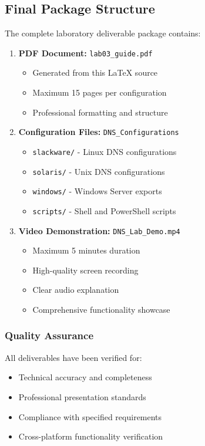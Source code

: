\documentclass[12pt,a4paper]{article}
\begin{document}
\subsection{Final Package Structure}\label{subsec:package-structure}

The complete laboratory deliverable package contains:

\begin{enumerate}
    \item \textbf{PDF Document:} \texttt{lab03\_guide.pdf}
    \begin{itemize}
        \item Generated from this LaTeX source
        \item Maximum 15 pages per configuration
        \item Professional formatting and structure
    \end{itemize}
    
    \item \textbf{Configuration Files:} \texttt{DNS\_Configurations}
    \begin{itemize}
        \item \texttt{slackware/} - Linux DNS configurations
        \item \texttt{solaris/} - Unix DNS configurations  
        \item \texttt{windows/} - Windows Server exports
        \item \texttt{scripts/} - Shell and PowerShell scripts
    \end{itemize}
    
    \item \textbf{Video Demonstration:} \texttt{DNS\_Lab\_Demo.mp4}
    \begin{itemize}
        \item Maximum 5 minutes duration
        \item High-quality screen recording
        \item Clear audio explanation
        \item Comprehensive functionality showcase
    \end{itemize}
\end{enumerate}

\subsubsection{Quality Assurance}
All deliverables have been verified for:
\begin{itemize}
    \item Technical accuracy and completeness
    \item Professional presentation standards
    \item Compliance with specified requirements
    \item Cross-platform functionality verification
\end{itemize}
\end{document}
